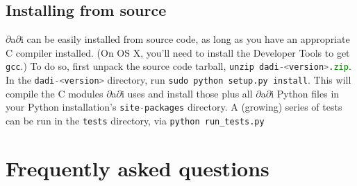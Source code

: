 \documentclass[12pt]{article}
\makeatletter
\newcommand{\dadi}{$\partial$a$\partial$i\xspace}
\newcommand{\py}[1]{\lstinline[language=Python, showstringspaces=False]@#1@}
\makeatother
\begin{document}
\subsection{Installing from source}

\dadi can be easily installed from source code, as long as you have an appropriate C compiler installed. (On OS X, you'll need to install the Developer Tools to get \py{gcc}.) To do so, first unpack the source code tarball, \py{unzip dadi-<version>.zip}.
In the \py{dadi-<version>} directory, run \py{sudo python setup.py install}.
This will compile the C modules \dadi uses and install those plus all \dadi Python files in your Python installation's \py{site-packages} directory.
A (growing) series of tests can be run in the \py{tests} directory, via \py{python run_tests.py}

\section{Frequently asked questions}
\end{document}

